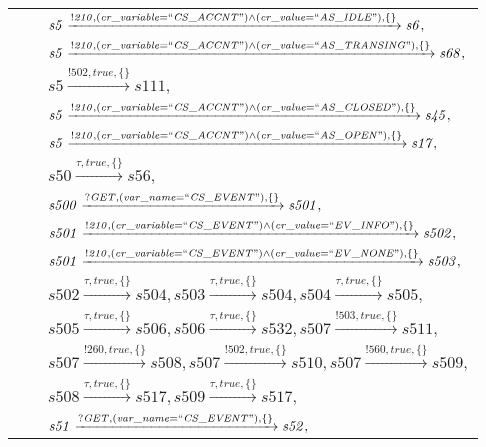 \begin{tabular}{lcl}
& & $\mathit{s5}\xrightarrow{\mathit{!210}, \mathit{(cr\_variable = ``CS\_ACCNT") \land (cr\_value = ``AS\_IDLE")}, \{\}}\mathit{s6},$ \\
& & $\mathit{s5}\xrightarrow{\mathit{!210}, \mathit{(cr\_variable = ``CS\_ACCNT") \land (cr\_value = ``AS\_TRANSING")}, \{\}}\mathit{s68},$ \\
& & $\mathit{s5}\xrightarrow{\mathit{!502}, \mathit{true}, \{\}}\mathit{s111},$ \\
& & $\mathit{s5}\xrightarrow{\mathit{!210}, \mathit{(cr\_variable = ``CS\_ACCNT") \land (cr\_value = ``AS\_CLOSED")}, \{\}}\mathit{s45},$ \\
& & $\mathit{s5}\xrightarrow{\mathit{!210}, \mathit{(cr\_variable = ``CS\_ACCNT") \land (cr\_value = ``AS\_OPEN")}, \{\}}\mathit{s17},$ \\
& & $\mathit{s50}\xrightarrow{\mathit{\tau}, \mathit{true}, \{\}}\mathit{s56},$ \\
& & $\mathit{s500}\xrightarrow{\mathit{?GET}, \mathit{(var\_name = ``CS\_EVENT")}, \{\}}\mathit{s501},$ \\
& & $\mathit{s501}\xrightarrow{\mathit{!210}, \mathit{(cr\_variable = ``CS\_EVENT") \land (cr\_value = ``EV\_INFO")}, \{\}}\mathit{s502},$ \\
& & $\mathit{s501}\xrightarrow{\mathit{!210}, \mathit{(cr\_variable = ``CS\_EVENT") \land (cr\_value = ``EV\_NONE")}, \{\}}\mathit{s503},$ \\
& & $\mathit{s502}\xrightarrow{\mathit{\tau}, \mathit{true}, \{\}}\mathit{s504},\mathit{s503}\xrightarrow{\mathit{\tau}, \mathit{true}, \{\}}\mathit{s504},\mathit{s504}\xrightarrow{\mathit{\tau}, \mathit{true}, \{\}}\mathit{s505},$ \\
& & $\mathit{s505}\xrightarrow{\mathit{\tau}, \mathit{true}, \{\}}\mathit{s506},\mathit{s506}\xrightarrow{\mathit{\tau}, \mathit{true}, \{\}}\mathit{s532},\mathit{s507}\xrightarrow{\mathit{!503}, \mathit{true}, \{\}}\mathit{s511},$ \\
& & $\mathit{s507}\xrightarrow{\mathit{!260}, \mathit{true}, \{\}}\mathit{s508},\mathit{s507}\xrightarrow{\mathit{!502}, \mathit{true}, \{\}}\mathit{s510},\mathit{s507}\xrightarrow{\mathit{!560}, \mathit{true}, \{\}}\mathit{s509},$ \\
& & $\mathit{s508}\xrightarrow{\mathit{\tau}, \mathit{true}, \{\}}\mathit{s517},\mathit{s509}\xrightarrow{\mathit{\tau}, \mathit{true}, \{\}}\mathit{s517},$ \\
& & $\mathit{s51}\xrightarrow{\mathit{?GET}, \mathit{(var\_name = ``CS\_EVENT")}, \{\}}\mathit{s52},$ \\
\end{tabular}

